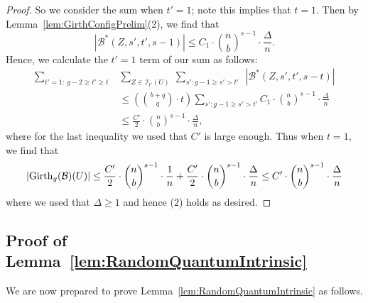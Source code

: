 \documentclass[11pt]{article}
\newcommand{\mc}[1]{\mathcal{#1}}
\newcounter{i}
\theoremstyle{plain}
\theoremstyle{plain} %
\theoremstyle{definition}
\begin{document}
\begin{proof}
So we consider the sum when $t'=1$; note this implies that $t=1$. Then by Lemma~\ref{lem:GirthConfigPrelim}(2), we find that
$$|\mc{B}^{*}(Z,s',t',s-1)|\le C_1\cdot \binom{n}{b}^{s-1}\cdot \frac{\Delta}{n}.$$
Hence, we calculate the $t'=1$ term of our sum as follows:
\begin{align*}
\sum_{t'=1:~g-2\ge t' \ge t} ~&\sum_{Z\in \mc{I}_{t'}(U)}~\sum_{s': g-1\ge s' > t'}~~|\mc{B}^{*}(Z,s',t',s-t)| \\
&\le \left(\binom{b+q}{q}\cdot t\right) \sum_{s': g-1\ge s' > t'}  C_1\cdot \binom{n}{b}^{s-1}\cdot \frac{\Delta}{n} \\
&\le \frac{C'}{2}\cdot \binom{n}{b}^{s-1}\cdot \frac{\Delta}{n},
\end{align*}
where for the last inequality we used that $C'$ is large enough. 
Thus when $t=1$, we find that
$$|{\rm Girth}_g(\mc{B})(U)|\le \frac{C'}{2} \cdot \binom{n}{b}^{s-1}\cdot \frac{1}{n} + \frac{C'}{2}\cdot \binom{n}{b}^{s-1}\cdot \frac{\Delta}{n}\le C'\cdot \binom{n}{b}^{s-1}\cdot \frac{\Delta}{n}$$
where we used that $\Delta \ge 1$ and hence (2) holds as desired. 
\end{proof}

\subsection{Proof of Lemma~\ref{lem:RandomQuantumIntrinsic}}

We are now prepared to prove Lemma~\ref{lem:RandomQuantumIntrinsic} as follows.
\end{document}
